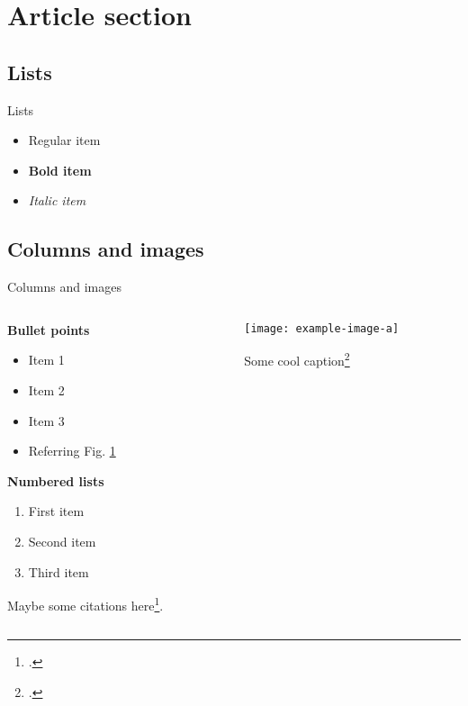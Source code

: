 
\section{Article section}

\subsection{Lists}
\begin{frame}{Lists}
  \begin{itemize}
      \item Regular item
      \item \textbf{Bold item}
      \item \textit{Italic item}
  \end{itemize}
\end{frame}

\subsection{Columns and images}

\begin{frame}{Columns and images}
\begin{columns}

    \begin{column}{0.45\textwidth}

        \textbf{Bullet points}
        \begin{itemize}
            \item Item 1
            \item Item 2
            \item Item 3
            \item Referring Fig. \ref{fig:example-label}
        \end{itemize}

        \textbf{Numbered lists}
        \begin{enumerate}
          \item First item
          \item Second item
          \item Third item
        \end{enumerate}

        Maybe some citations here\footcite{anonymous2023website}.

    \end{column}

    \begin{column}{0.45\textwidth}
      \begin{figure}
        \centering
        \texttt{[image: example-image-a]}
        \caption{Some cool caption\footcite{doe2023example}}
        \label{fig:example-label}
      \end{figure}
      
    \end{column}

\end{columns}
\end{frame}

